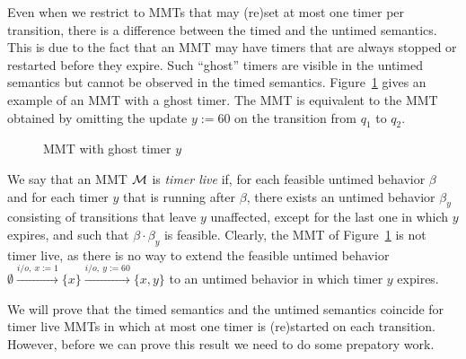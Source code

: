 Even when we restrict to MMTs that may (re)set at most one timer per transition, there is a difference
between the timed and the untimed semantics.
This is due to the fact that an MMT may have timers that are always stopped or restarted before
they expire. Such ``ghost'' timers are visible in the untimed semantics but cannot be observed in the timed semantics.
\iflong
Figure~\ref{fig:ghosttimers} gives an example of an MMT with a ghost timer. The MMT is equivalent to the MMT obtained by 
omitting the update $y :=60$ on the transition from $q_1$ to $q_2$.
\begin{figure}
\begin{center}
\caption{MMT with ghost timer $y$}
\label{fig:ghosttimers}
\end{center}
\end{figure}
\fi
%
We say that an MMT ${\cal M}$ is \emph{timer live} if, for each feasible untimed behavior $\beta$ and for each timer $y$ that is running after $\beta$, there exists an untimed behavior $\beta_y$ consisting of transitions that leave $y$ unaffected, except for the last one in which $y$ expires, and such that $\beta \cdot \beta_y$ is feasible.
\iflong
Clearly, the MMT of Figure~\ref{fig:ghosttimers} is not timer live, as there is no way to extend the feasible untimed
behavior $\emptyset \xrightarrow{i/o,~ x:=1 } \{ x\} \xrightarrow{i/o,~ y:=60 } \{ x, y\}$ to an untimed behavior in which
timer $y$ expires.
\fi

We will prove that the timed semantics and the untimed semantics coincide for timer live MMTs in which at most one timer is (re)started on each transition. However, before we can prove this result we need to do some prepatory work.

